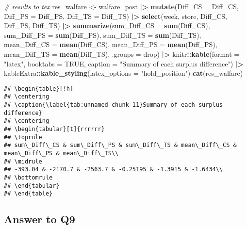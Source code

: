 \documentclass[
]{article}
\newenvironment{Shaded}{\begin{snugshade}}{\end{snugshade}}
\newcommand{\AttributeTok}[1]{\textcolor[rgb]{0.13,0.29,0.53}{#1}}
\newcommand{\CommentTok}[1]{\textcolor[rgb]{0.56,0.35,0.01}{\textit{#1}}}
\newcommand{\ConstantTok}[1]{\textcolor[rgb]{0.56,0.35,0.01}{#1}}
\newcommand{\FunctionTok}[1]{\textcolor[rgb]{0.13,0.29,0.53}{\textbf{#1}}}
\newcommand{\NormalTok}[1]{#1}
\newcommand{\OtherTok}[1]{\textcolor[rgb]{0.56,0.35,0.01}{#1}}
\newcommand{\SpecialCharTok}[1]{\textcolor[rgb]{0.81,0.36,0.00}{\textbf{#1}}}
\newcommand{\StringTok}[1]{\textcolor[rgb]{0.31,0.60,0.02}{#1}}
\begin{document}
\begin{Shaded}
\begin{Highlighting}[]
\CommentTok{\# results to tex}
\NormalTok{res\_walfare }\OtherTok{\textless{}{-}}\NormalTok{ walfare\_post }\SpecialCharTok{|\textgreater{}}
  \FunctionTok{mutate}\NormalTok{(}\AttributeTok{Diff\_CS =}\NormalTok{ Diff\_CS, }\AttributeTok{Diff\_PS =}\NormalTok{ Diff\_PS, }\AttributeTok{Diff\_TS =}\NormalTok{ Diff\_TS) }\SpecialCharTok{|\textgreater{}}
  \FunctionTok{select}\NormalTok{(week, store, Diff\_CS, Diff\_PS, Diff\_TS) }\SpecialCharTok{|\textgreater{}}
  \FunctionTok{summarize}\NormalTok{(}\AttributeTok{sum\_Diff\_CS =} \FunctionTok{sum}\NormalTok{(Diff\_CS), }\AttributeTok{sum\_Diff\_PS =} \FunctionTok{sum}\NormalTok{(Diff\_PS), }\AttributeTok{sum\_Diff\_TS =} \FunctionTok{sum}\NormalTok{(Diff\_TS), }
            \AttributeTok{mean\_Diff\_CS =} \FunctionTok{mean}\NormalTok{(Diff\_CS), }\AttributeTok{mean\_Diff\_PS =} \FunctionTok{mean}\NormalTok{(Diff\_PS), }\AttributeTok{mean\_Diff\_TS =} \FunctionTok{mean}\NormalTok{(Diff\_TS), }
            \AttributeTok{.groups =} \StringTok{\textquotesingle{}drop\textquotesingle{}}\NormalTok{) }\SpecialCharTok{|\textgreater{}}
\NormalTok{  knitr}\SpecialCharTok{::}\FunctionTok{kable}\NormalTok{(}\AttributeTok{format =} \StringTok{"latex"}\NormalTok{, }\AttributeTok{booktabs =} \ConstantTok{TRUE}\NormalTok{, }
               \AttributeTok{caption =} \StringTok{"Summary of each surplus difference"}\NormalTok{) }\SpecialCharTok{|\textgreater{}}
\NormalTok{  kableExtra}\SpecialCharTok{::}\FunctionTok{kable\_styling}\NormalTok{(}\AttributeTok{latex\_options =} \StringTok{"hold\_position"}\NormalTok{)}
\FunctionTok{cat}\NormalTok{(res\_walfare)}
\end{Highlighting}
\end{Shaded}

\begin{verbatim}
## \begin{table}[!h]
## \centering
## \caption{\label{tab:unnamed-chunk-11}Summary of each surplus difference}
## \centering
## \begin{tabular}[t]{rrrrrr}
## \toprule
## sum\_Diff\_CS & sum\_Diff\_PS & sum\_Diff\_TS & mean\_Diff\_CS & mean\_Diff\_PS & mean\_Diff\_TS\\
## \midrule
## -393.04 & -2170.7 & -2563.7 & -0.25195 & -1.3915 & -1.6434\\
## \bottomrule
## \end{tabular}
## \end{table}
\end{verbatim}

\hypertarget{answer-to-q9}{%
\subsection{Answer to Q9}\label{answer-to-q9}}
\end{document}
